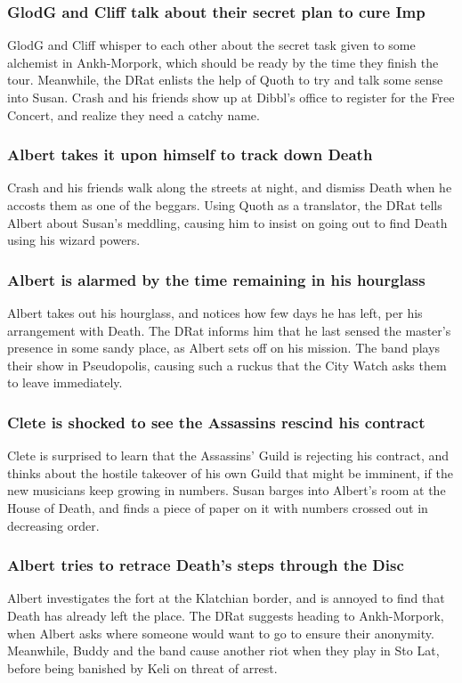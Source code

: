 \subsubsection{\Gls{GlodG} and \Gls{Cliff} talk about their secret plan to cure \Gls{Imp}}
\Gls{GlodG} and \Gls{Cliff} whisper to each other about the secret task given to some alchemist in
Ankh-Morpork, which should be ready by the time they finish the tour. Meanwhile, the \Gls{DRat}
enlists the help of \Gls{Quoth} to try and talk some sense into \Gls{Susan}. \Gls{Crash} and his
friends show up at \Gls{Dibbl}'s office to register for the Free Concert, and realize they need a
catchy name.

\subsubsection{\Gls{Albert} takes it upon himself to track down \Gls{Death}}
\Gls{Crash} and his friends walk along the streets at night, and dismiss \Gls{Death} when he
accosts them as one of the beggars. Using \Gls{Quoth} as a translator, the \Gls{DRat} tells
\Gls{Albert} about \Gls{Susan}'s meddling, causing him to insist on going out to find \Gls{Death}
using his wizard powers.

\subsubsection{\Gls{Albert} is alarmed by the time remaining in his hourglass}
\Gls{Albert} takes out his hourglass, and notices how few days he has left, per his arrangement with
\Gls{Death}. The \Gls{DRat} informs him that he last sensed the master's presence in some sandy
place, as \Gls{Albert} sets off on his mission. The band plays their show in Pseudopolis, causing
such a ruckus that the City Watch asks them to leave immediately.

\subsubsection{\Gls{Clete} is shocked to see the Assassins rescind his contract}
\Gls{Clete} is surprised to learn that the Assassins' Guild is rejecting his contract, and thinks
about the hostile takeover of his own Guild that might be imminent, if the new musicians keep
growing in numbers. \Gls{Susan} barges into \Gls{Albert}'s room at the House of \Gls{Death}, and
finds a piece of paper on it with numbers crossed out in decreasing order.

\subsubsection{\Gls{Albert} tries to retrace \Gls{Death}'s steps through the Disc}
\Gls{Albert} investigates the fort at the Klatchian border, and is annoyed to find that \Gls{Death}
has already left the place. The \Gls{DRat} suggests heading to Ankh-Morpork, when \Gls{Albert} asks
where someone would want to go to ensure their anonymity. Meanwhile, \Gls{Buddy} and the band cause
another riot when they play in Sto Lat, before being banished by \Gls{Keli} on threat of arrest.

